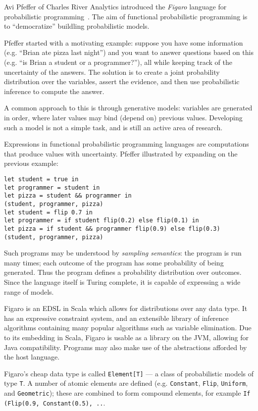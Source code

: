 \documentclass{jfp1}
\begin{document}

Avi Pfeffer of Charles River Analytics introduced the \textit{Figaro} language
for probabilistic programming~\cite{Pfeffer:2009:Figaro}. The aim of
functional probabilistic programming is to ``democratize'' buildling
probabilistic models.

Pfeffer started with a motivating example: suppose you have some
information (e.g. ``Brian ate pizza last night'') and you want to
answer questions based on this (e.g. ``is Brian a student or a
programmer?''), all while keeping track of the uncertainty of the
answers. The solution is to create a joint probability distribution
over the variables, assert the evidence, and then use probabilistic
inference to compute the answer.

A common approach to this is through generative models: variables are
generated in order, where later values may bind (depend on) previous
values. Developing such a model is not a simple task, and is still an
active area of research.

Expressions in functional probabilistic programming languages are
computations that produce values with uncertainty. Pfeffer illustrated
by expanding on the previous example:

\begin{verbatim}
let student = true in
let programmer = student in
let pizza = student && programmer in
(student, programmer, pizza)
let student = flip 0.7 in
let programmer = if student flip(0.2) else flip(0.1) in
let pizza = if student && programmer flip(0.9) else flip(0.3)
(student, programmer, pizza)
\end{verbatim}

Such programs may be understood by \textit{sampling semantics}:
the program is run many times; each outcome of the program has
some probability of being generated. Thus the program defines a
probability distribution over outcomes. Since the language itself is
Turing complete, it is capable of expressing a wide range of models.

Figaro is an EDSL in Scala which allows for distributions over any
data type. It has an expressive constraint system, and an extensible
library of inference algorithms containing many popular algorithms
such as variable elimination. Due to its embedding in Scala, Figaro
is usable as a library on the JVM, allowing for Java compatibility.
Programs may also make use of the abstractions afforded
by the host language.

Figaro's cheap data type is called \texttt{Element[T]} --- a class of
probabilistic models of type \texttt{T}. A number of atomic elements
are defined (e.g. \texttt{Constant}, \texttt{Flip}, \texttt{Uniform}, and
\texttt{Geometric}); these are combined to form compound elements, 
for example \texttt{If (Flip(0.9, Constant(0.5), ..}.
\end{document}
